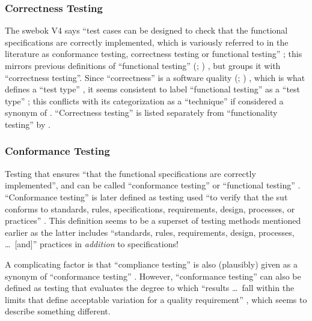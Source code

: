 \subsubsection{Correctness Testing}
\ifnotpaper \citeauthor{SWEBOK2024} \else The \acs{swebok} V4 \fi says
``test cases can be designed to check that the functional
specifications are correctly implemented, which is variously
referred to in the literature as conformance testing, correctness
testing or functional testing'' \ifnotpaper \citeyearpar[p.~5-7]{SWEBOK2024}%
\else \cite[p.~5-7]{SWEBOK2024}\fi; this mirrors previous definitions
of ``functional testing'' \ifnotpaper (\citealp[p.~21]{IEEE2022};
      \citeyear[p.~196]{IEEE2017}) \else \cite[p.~196]{IEEE2017},
      \cite[p.~21]{IEEE2022} \fi but groups it with ``correctness
testing''. Since ``correctness'' is a software quality \ifnotpaper
      (\citealp[p.~104]{IEEE2017}; \citealp[p.~3-13]{SWEBOK2024}) \else
      \cite[p.~104]{IEEE2017}, \cite[p.~3-13]{SWEBOK2024} \fi which is
what defines a ``test type'' \citep[p.~15]{IEEE2022},
it seems consistent to label ``functional testing'' as a ``test type''
\citep[pp.~15,~20,~22]{IEEE2022}; this conflicts with its categorization
as a ``technique'' if considered a synonym of .
``Correctness testing'' is listed separately from ``functionality testing'' by
\citet[p.~53]{Firesmith2015}.

\subsubsection{Conformance Testing}
Testing that ensures ``that the functional specifications are correctly
implemented'', and can be called ``conformance testing'' or ``functional
testing'' \citep[p.~5-7]{SWEBOK2024}.
``Conformance testing'' is later defined as testing used ``to
verify that the \acs{sut} conforms to standards, rules,
specifications, requirements, design, processes, or practices''
\citep[p.~5-7]{SWEBOK2024}. This definition seems to be a superset
of testing methods mentioned earlier as the latter includes ``standards,
rules, requirements, design, processes, \dots\ [and]'' practices in
\emph{addition} to specifications!

A complicating factor is that ``compliance testing'' is also
(plausibly) given as a synonym of ``conformance testing''
\citep[p.~43]{Kam2008}. However, ``conformance
testing'' can also be defined as testing that evaluates the degree
to which ``results \dots\ fall within the limits that define
acceptable variation for a quality requirement''
\citep[p.~93]{IEEE2017}, which seems to
describe something different.

